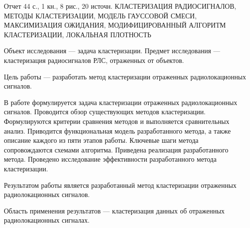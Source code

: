 {}
Отчет 44 с., 1 кн., 8 рис., 20 источн. \newline
КЛАСТЕРИЗАЦИЯ РАДИОСИГНАЛОВ, МЕТОДЫ КЛАСТЕРИЗАЦИИ, МОДЕЛЬ ГАУССОВОЙ СМЕСИ, МАКСИМИЗАЦИЯ ОЖИДАНИЯ, МОДИФИЦИРОВАННЫЙ АЛГОРИТМ КЛАСТЕРИЗАЦИИ, ЛОКАЛЬНАЯ ПЛОТНОСТЬ

Объект исследования --- задача кластеризации. Предмет исследования --- кластеризация радиосигналов РЛС, отраженных от объектов.

Цель работы --- разработать метод кластеризации отраженных радиолокационных сигналов.

В работе формулируется задача кластеризации отраженных радиолокационных сигналов. Проводится обзор существующих методов кластеризации. Формулируются критерии сравнения методов и выполняется сравнительных анализ. Приводится функциональная модель разработанного метода, а также описание каждого из пяти этапов работы. Ключевые шаги метода сопровождаются схемами алгоритма. Приведена реализация разработанного метода. Проведено исследование эффективности разработанного метода кластеризации.

Результатом работы является разработанный метод кластеризации отраженных радиолокационных сигналов.

Область применения результатов --- кластеризация данных об отраженных радиолокационных сигналах.
